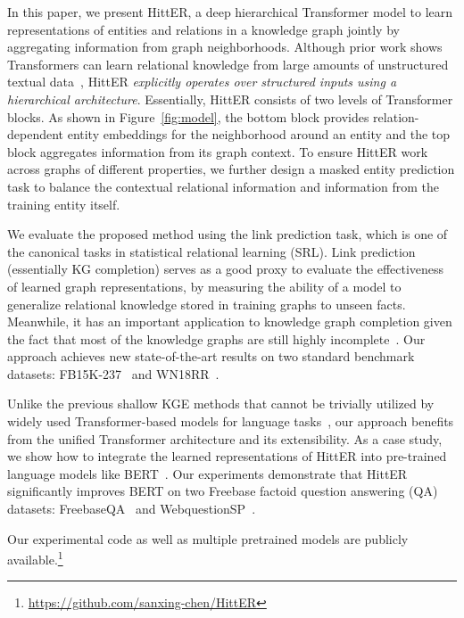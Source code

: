 \documentclass[11pt]{article}
\newcommand{\hit}{HittER\xspace}
\begin{document}
In this paper, we present \hit, a deep hierarchical Transformer model to learn representations of entities and relations in a knowledge graph jointly by aggregating information from graph neighborhoods.
Although prior work shows Transformers can learn relational knowledge from large amounts of unstructured textual data~\cite{jiang-et-al-2020-how,manning2020emergent},
HittER \emph{explicitly operates over structured inputs using a hierarchical architecture}.
Essentially, HittER consists of two levels of Transformer blocks.
As shown in Figure~\ref{fig:model}, the bottom block provides relation-dependent entity embeddings for the neighborhood around an entity and the top block aggregates information from its graph context.
To ensure HittER work across graphs of different properties, we further design a masked entity prediction task to balance the contextual relational information and information from the training entity itself.




We evaluate the proposed method using the link prediction task, which is one of the canonical tasks in statistical relational learning (SRL).
Link prediction (essentially KG completion) serves as a good proxy to evaluate the effectiveness of learned graph representations, by measuring the ability of a model to generalize relational knowledge stored in training graphs to unseen facts.
Meanwhile, it has an important application to knowledge graph completion given the fact that most of the knowledge graphs are still highly incomplete~\cite{west2014knowledge}.
Our approach achieves new state-of-the-art results on two standard benchmark datasets: FB15K-237~\cite{toutanova-chen-2015-observed} and WN18RR~\cite{dettmers2018conve}.

Unlike the previous shallow KGE methods that cannot be trivially utilized by widely used Transformer-based models for language tasks~\cite{peters-etal-2019-knowledge}, our approach benefits from the unified Transformer architecture and its extensibility.
As a case study, we show how to integrate the learned representations of \hit into pre-trained language models like BERT~\cite{devlin-etal-2019-bert}.
Our experiments demonstrate that \hit{} significantly improves BERT on two Freebase factoid question answering (QA) datasets: FreebaseQA~\cite{jiang-etal-2019-freebaseqa} and WebquestionSP~\cite{yih-etal-2016-value}.

Our experimental code as well as multiple pretrained models are publicly available.\footnote{\url{https://github.com/sanxing-chen/HittER}}
\end{document}
